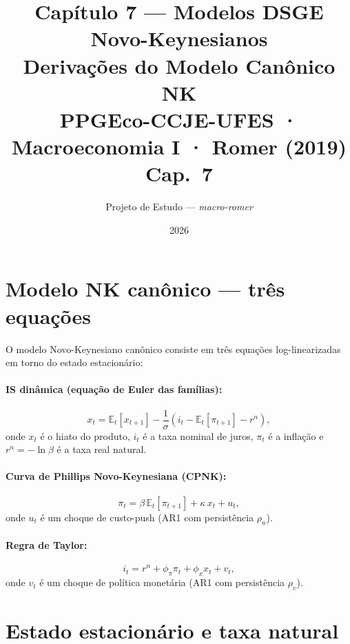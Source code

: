 \documentclass[11pt,a4paper]{article}
\title{\textbf{Capítulo 7 --- Modelos DSGE Novo-Keynesianos}\\[4pt]
       {\large Derivações do Modelo Canônico NK}\\[2pt]
       {\normalsize PPGEco-CCJE-UFES · Macroeconomia I · Romer (2019) Cap.\ 7}}
\author{Projeto de Estudo --- \textit{macro-romer}}
\date{2026}
\newcommand{\E}{\mathbb{E}}
\begin{document}
\maketitle
\tableofcontents
\bigskip

\section{Modelo NK canônico --- três equações}

O modelo Novo-Keynesiano canônico consiste em três equações log-linearizadas
em torno do estado estacionário:

\paragraph{IS dinâmica (equação de Euler das famílias):}
\begin{equation}\label{eq:is}
  x_t = \E_t[x_{t+1}] - \frac{1}{\sigma}(i_t - \E_t[\pi_{t+1}] - r^n),
\end{equation}
onde $x_t$ é o hiato do produto, $i_t$ é a taxa nominal de juros,
$\pi_t$ é a inflação e $r^n = -\ln\beta$ é a taxa real natural.

\paragraph{Curva de Phillips Novo-Keynesiana (CPNK):}
\begin{equation}\label{eq:nkpc}
  \pi_t = \beta\,\E_t[\pi_{t+1}] + \kappa\, x_t + u_t,
\end{equation}
onde $u_t$ é um choque de custo-push (AR1 com persistência $\rho_u$).

\paragraph{Regra de Taylor:}
\begin{equation}\label{eq:taylor}
  i_t = r^n + \phi_\pi \pi_t + \phi_x x_t + v_t,
\end{equation}
onde $v_t$ é um choque de política monetária (AR1 com persistência $\rho_v$).

\section{Estado estacionário e taxa natural}
\end{document}
